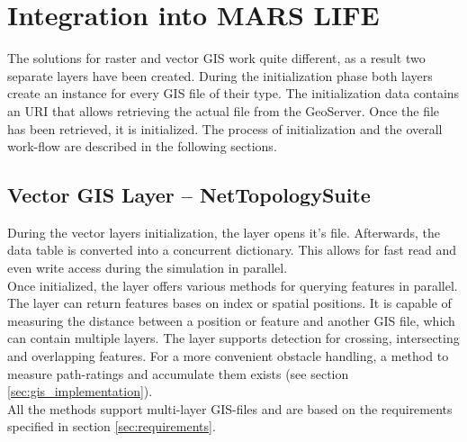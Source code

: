 \section{Integration into MARS LIFE}
The solutions for raster and vector GIS work quite different, as a result two separate layers have been created. During the initialization phase both layers create an instance for every GIS file of their type. The initialization data contains an URI that allows retrieving the actual file from the GeoServer. Once the file has been retrieved, it is initialized. The process of initialization and the overall work-flow are described in the following sections.


\subsection{Vector GIS Layer -- NetTopologySuite}
During the vector layers initialization, the layer opens it's file. Afterwards, the data table is converted into a concurrent dictionary. This allows for fast read and even write access during the simulation in parallel.\\
Once initialized, the layer offers various methods for querying features in parallel. The layer can return features bases on index or spatial positions. It is capable of measuring the distance between a position or feature and another GIS file, which can contain multiple layers. The layer supports detection for crossing, intersecting and overlapping features. For a more convenient obstacle handling, a method to measure path-ratings and accumulate them exists (see section \ref{sec:gis_implementation}).\\
All the methods support multi-layer GIS-files and are based on the requirements specified in section \ref{sec:requirements}.


